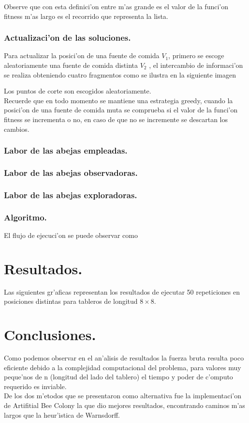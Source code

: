 \documentclass[12pt]{article}
\begin{document}
    Observe que con esta definici'on entre m'as grande es el valor de la funci'on fitness m'as
    largo es el recorrido que representa la lista.

    \subsubsection{Actualizaci'on de las soluciones.}

    Para actualizar la posici'on de una fuente de comida $V_{1}$, primero se
    escoge aleatoriamente una fuente de comida distinta $V_{2}$ , el intercambio
    de informaci'on se realiza obteniendo cuatro fragmentos como se ilustra en
    la siguiente imagen

    Los puntos de corte son escogidos aleatoriamente.\\
    Recuerde que en todo momento se mantiene una estrategia greedy, cuando la posici'on de una fuente de comida muta se comprueba
    si el valor de la funci'on fitness se incrementa o no, en caso de que no se incremente se descartan los cambios.

    \subsubsection{Labor de las abejas empleadas.}

    \subsubsection{Labor de las abejas observadoras.}

    \subsubsection{Labor de las abejas exploradoras.}

    \subsubsection{Algoritmo.}
    El flujo de ejecuci'on se puede observar como



    \section{Resultados.}
    Las siguientes gr'aficas representan los resultados de ejecutar 50 repeticiones en posiciones distintas
    para tableros de longitud $8 \times 8$.

    \section{Conclusiones.}
    Como podemos observar en el an'alisis de resultados la fuerza bruta
    resulta poco eficiente debido a la complejidad computacional del problema,
    para valores muy peque'nos de n (longitud del lado del tablero)
    el tiempo y poder de c'omputo requerido es inviable. \\
    De los  dos m'etodos que se presentaron como alternativa
    fue la implementaci'on de Artifitial Bee Colony la que dio mejores resultados,
    encontrando caminos m'as largos que la heur'istica de Warnsdorff. \\
\end{document}
